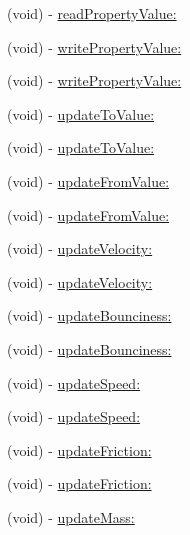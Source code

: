 \begin{DoxyCompactItemize}
\item 
(void) -\/ \mbox{\hyperlink{interface_p_o_p_animation_tracer_a219ed8a35e2d3fa997e5688386572f15}{read\+Property\+Value\+:}}
\item 
(void) -\/ \mbox{\hyperlink{interface_p_o_p_animation_tracer_aa703f72cf374b9f6feb44c0fe8d508d9}{write\+Property\+Value\+:}}
\item 
(void) -\/ \mbox{\hyperlink{interface_p_o_p_animation_tracer_aa703f72cf374b9f6feb44c0fe8d508d9}{write\+Property\+Value\+:}}
\item 
(void) -\/ \mbox{\hyperlink{interface_p_o_p_animation_tracer_a00d4c0e1b6b446081cfb6c153f37a633}{update\+To\+Value\+:}}
\item 
(void) -\/ \mbox{\hyperlink{interface_p_o_p_animation_tracer_a00d4c0e1b6b446081cfb6c153f37a633}{update\+To\+Value\+:}}
\item 
(void) -\/ \mbox{\hyperlink{interface_p_o_p_animation_tracer_aa5cc867da95a73d3254f38a86281233a}{update\+From\+Value\+:}}
\item 
(void) -\/ \mbox{\hyperlink{interface_p_o_p_animation_tracer_aa5cc867da95a73d3254f38a86281233a}{update\+From\+Value\+:}}
\item 
(void) -\/ \mbox{\hyperlink{interface_p_o_p_animation_tracer_ab828c06696377e94ba3bdd490b5cd146}{update\+Velocity\+:}}
\item 
(void) -\/ \mbox{\hyperlink{interface_p_o_p_animation_tracer_ab828c06696377e94ba3bdd490b5cd146}{update\+Velocity\+:}}
\item 
(void) -\/ \mbox{\hyperlink{interface_p_o_p_animation_tracer_a61998b16b4eb5df6d11dbd0bd269339c}{update\+Bounciness\+:}}
\item 
(void) -\/ \mbox{\hyperlink{interface_p_o_p_animation_tracer_a61998b16b4eb5df6d11dbd0bd269339c}{update\+Bounciness\+:}}
\item 
(void) -\/ \mbox{\hyperlink{interface_p_o_p_animation_tracer_a7f31ab4b95f8d9409a77b78bf7b8af1d}{update\+Speed\+:}}
\item 
(void) -\/ \mbox{\hyperlink{interface_p_o_p_animation_tracer_a7f31ab4b95f8d9409a77b78bf7b8af1d}{update\+Speed\+:}}
\item 
(void) -\/ \mbox{\hyperlink{interface_p_o_p_animation_tracer_aba012bff58a203420d1adf3e922491e0}{update\+Friction\+:}}
\item 
(void) -\/ \mbox{\hyperlink{interface_p_o_p_animation_tracer_aba012bff58a203420d1adf3e922491e0}{update\+Friction\+:}}
\item 
(void) -\/ \mbox{\hyperlink{interface_p_o_p_animation_tracer_a1e41c2f1b7c5332730d2c834e0420367}{update\+Mass\+:}}

\end{DoxyCompactItemize}
